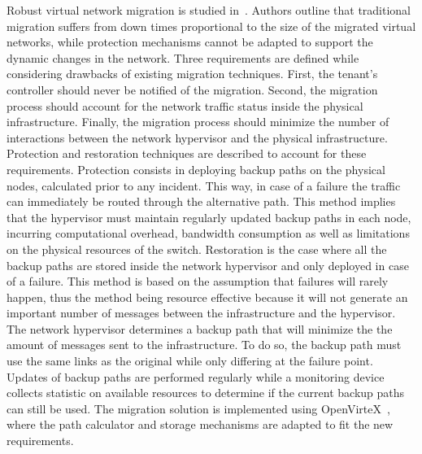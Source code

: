 Robust virtual network migration is studied in~\cite{Ko2017c}. Authors outline that traditional migration suffers from down times proportional to the size of the migrated virtual networks, while protection mechanisms cannot be adapted to support the dynamic changes in the network.
Three requirements are defined while considering drawbacks of existing migration techniques. 
First, the tenant's controller should never be notified of the migration.
Second, the migration process should account for the network traffic status inside the physical infrastructure.
Finally, the migration process should minimize the number of interactions between the network hypervisor and the physical infrastructure.
Protection and restoration techniques are described to account for these requirements.
Protection consists in deploying backup paths on the physical nodes, calculated prior to any incident.
This way, in case of a failure the traffic can immediately be routed through the alternative path. 
This method implies that the hypervisor must maintain regularly updated backup paths in each node, incurring computational overhead, bandwidth consumption as well as limitations on the physical resources of the switch.
Restoration is the case where all the backup paths are stored inside the network hypervisor and only deployed in case of a failure.
This method is based on the assumption that failures will rarely happen, thus the method being resource effective because it will not generate an important number of messages between the infrastructure and the hypervisor.
The network hypervisor determines a backup path that will minimize the the amount of messages sent to the infrastructure.
To do so, the backup path must use the same links as the original while only differing at the failure point.
Updates of backup paths are performed regularly while a monitoring device collects statistic on available resources to determine if the current backup paths can still be used.
The migration solution is implemented using OpenVirteX~\cite{OpenVirteX-Al-Shabibi2014}, where the path calculator and storage mechanisms are adapted to fit the new requirements. 

